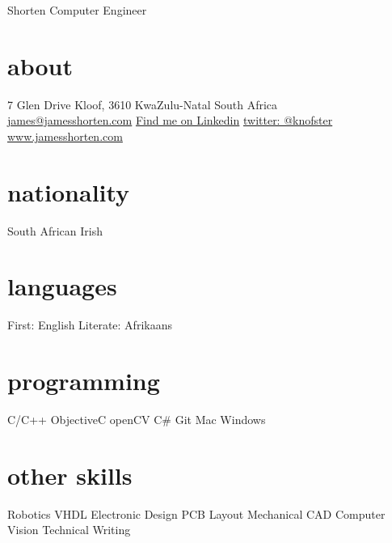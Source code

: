 \documentclass[a4paper]{friggeri-cv}
\begin{document}
 { Shorten}
       {Computer Engineer}


\begin{aside}
  \section{about}
    7 Glen Drive
    Kloof, 3610
    KwaZulu-Natal
    South Africa 
    ~
    \href{mailto:james@jamesshorten.com}{james@jamesshorten.com}
    \href{http://za.linkedin.com/in/knofst}{Find me on Linkedin}
    \href{https://twitter.com/knofster}{twitter: @knofster}
    \href{www.jamesshorten.com}{www.jamesshorten.com}
    
    \section{nationality}
     South African
     Irish
  \section{languages}
    First: English
    Literate: Afrikaans
  \section{programming}
    C/C++
    ObjectiveC
    openCV
    C\#
    Git
    Mac
    Windows
  \section{other skills}
    Robotics
    VHDL
  	Electronic Design
  	PCB Layout
  	Mechanical CAD
  	Computer Vision
  	Technical Writing
\end{aside}
\end{document}
